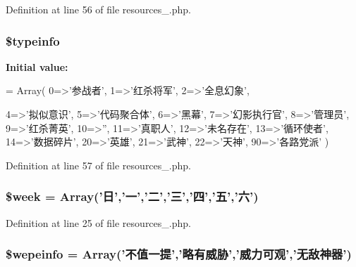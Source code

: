 Definition at line 56 of file resources\+\_.\+php.

\hypertarget{resources__1_8php_afeaf726d0642146d7bf10c04e2c99075}{
\subsubsection[{\$typeinfo}]{\setlength{\rightskip}{0pt plus 5cm}\$typeinfo}}\label{resources__1_8php_afeaf726d0642146d7bf10c04e2c99075}
{\bfseries Initial value\+:}
\begin{DoxyCode}
= Array(
    0=>\textcolor{stringliteral}{'参战者'},
    1=>\textcolor{stringliteral}{'红杀将军'},
    2=>\textcolor{stringliteral}{'全息幻象'},
    
    4=>\textcolor{stringliteral}{'拟似意识'},
    5=>\textcolor{stringliteral}{'代码聚合体'},
    6=>\textcolor{stringliteral}{'黑幕'},
    7=>\textcolor{stringliteral}{'幻影执行官'},
    8=>\textcolor{stringliteral}{'管理员'},
    9=>\textcolor{stringliteral}{'红杀菁英'},
    10=>\textcolor{stringliteral}{''},
    11=>\textcolor{stringliteral}{'真职人'},
    12=>\textcolor{stringliteral}{'未名存在'},
    13=>\textcolor{stringliteral}{'循环使者'},
    14=>\textcolor{stringliteral}{'数据碎片'},
    20=>\textcolor{stringliteral}{'英雄'},
    21=>\textcolor{stringliteral}{'武神'},
    22=>\textcolor{stringliteral}{'天神'},
    90=>\textcolor{stringliteral}{'各路党派'}
    )
\end{DoxyCode}


Definition at line 57 of file resources\+\_.\+php.

\hypertarget{resources__1_8php_ad51e8a8cd3d4faaf3cb8e8b75dea029f}{
\subsubsection[{\$week}]{\setlength{\rightskip}{0pt plus 5cm}\$week = Array('日','一','二','三','四','五','六')}}\label{resources__1_8php_ad51e8a8cd3d4faaf3cb8e8b75dea029f}


Definition at line 25 of file resources\+\_.\+php.

\hypertarget{resources__1_8php_a24d2c967a140f9ff99ba082c9353f696}{
\subsubsection[{\$wepeinfo}]{\setlength{\rightskip}{0pt plus 5cm}\$wepeinfo = Array('不值一提','略有威胁','威力可观','无敌神器')}}\label{resources__1_8php_a24d2c967a140f9ff99ba082c9353f696}


